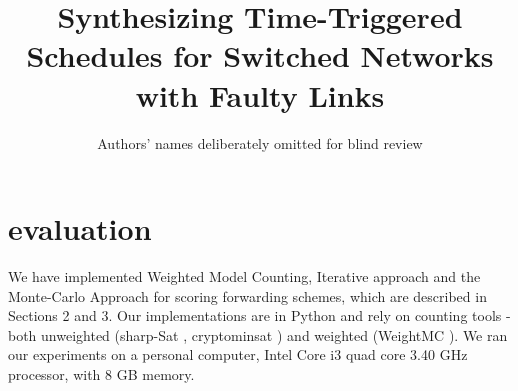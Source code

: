 \documentclass{sig-alternate-05-2015}[9pt]
\theoremstyle{definition}
\begin{document}






	\title{Synthesizing Time-Triggered Schedules for Switched Networks with Faulty Links}
	\author{Authors' names deliberately omitted for blind review}




	\maketitle


\section{evaluation}
	We have implemented Weighted Model Counting, Iterative approach and the Monte-Carlo Approach for scoring forwarding schemes, which are described in Sections 2 and 3. Our implementations are in Python and rely on counting tools - both unweighted (sharp-Sat \cite{sharpSat}, cryptominsat \cite{cryptominsat}) and weighted (WeightMC \cite{WeightMC}). We ran our experiments on a personal computer, Intel Core i3 quad core 3.40 GHz processor, with 8 GB memory.
\end{document}
